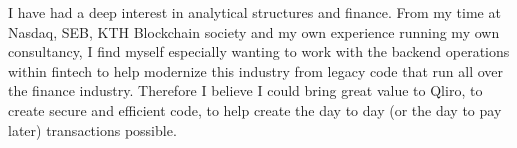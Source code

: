 \documentclass[../../main.tex]{subfiles}
\begin{document}
I have had a deep interest in analytical structures and finance. From my time at Nasdaq, SEB, KTH Blockchain society and my own experience running my own consultancy, I find myself especially wanting to work with the backend operations within fintech to help modernize this industry from legacy code that run all over the finance industry. Therefore I believe I could bring great value to Qliro, to create secure and efficient code, to help create the day to day (or the day to pay later) transactions possible.
\\
\end{document}
